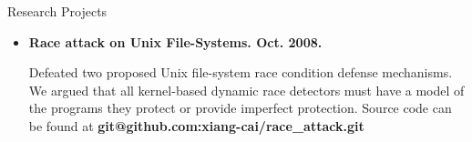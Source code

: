 \documentclass[11pt,oneside]{article}
\newenvironment{ressection}[1]{
	\vspace{4pt}
	{\fontfamily{phv}\selectfont\Large#1}
	\begin{itemize}
	\vspace{3pt}
}{
	\end{itemize}
}
\newcommand{\resitem}[1]{
	\vspace{-4pt}
	\item \begin{flushleft} #1 \end{flushleft}
}
\newcommand{\resbigitem}[3]{
	\vspace{-5pt}
	\item
	\textbf{#1}---#2 \\
	\textit{#3}
}
\newenvironment{ressubsec}[3]{
	\resbigitem{#1}{#2}{#3}
	\vspace{-2pt}
	\begin{itemize}
}{
	\end{itemize}
}
\begin{document}
\begin{ressection}{Research Projects}
	\resitem{\textbf{Race attack on Unix File-Systems. Oct. 2008.}
		\begin{small}
		
		Defeated two proposed Unix file-system race
			condition defense mechanisms. We argued that all
			kernel-based dynamic race detectors must have a model of
			the programs they protect or provide imperfect
			protection. Source code can be found at \textbf{git@github.com:xiang-cai/race\_attack.git}
		\end{small}
	} 


%
%
%					
%			



\end{ressection}
\end{document}
